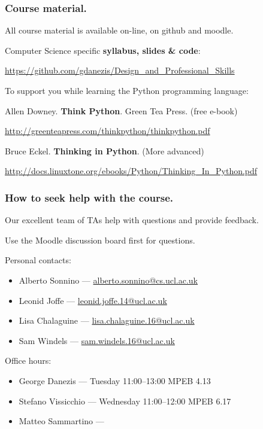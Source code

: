 \documentclass{beamer} %
\newcommand\emc[1]{\textcolor{brightblue}{\textbf{#1}}}
\begin{document}
\begin{frame}
\frametitle{Course material.} 

All course material is available on-line, on github and moodle.

\vspace{7mm}
Computer Science specific \emc{syllabus, slides \& code}: 

\url{https://github.com/gdanezis/Design_and_Professional_Skills}

\vspace{7mm}
To support you while learning the Python programming language:

\vspace{2mm}
Allen Downey. \emc{Think Python}. Green Tea Press. (free e-book)

{\small \url{http://greenteapress.com/thinkpython/thinkpython.pdf} }

\vspace{2mm}
Bruce Eckel. \emc{Thinking in Python}. (More advanced)

{\small \url{http://docs.linuxtone.org/ebooks/Python/Thinking_In_Python.pdf} }


\end{frame}

\begin{frame}
\frametitle{How to seek help with the course.} 

Our excellent team of TAs help with questions and provide feedback.

Use the Moodle discussion board first for questions.

\vspace{3mm}
Personal contacts:
\begin{itemize}
\item Alberto Sonnino --- \url{alberto.sonnino@cs.ucl.ac.uk}
\item Leonid Joffe --- \url{leonid.joffe.14@ucl.ac.uk}
\item Lisa Chalaguine --- \url{lisa.chalaguine.16@ucl.ac.uk}
\item Sam Windels --- \url{sam.windels.16@ucl.ac.uk}
\end{itemize}

\vspace{3mm}
Office hours:
\begin{itemize}
\item George Danezis --- Tuesday 11:00--13:00 MPEB 4.13
\item Stefano Vissicchio --- Wednesday 11:00--12:00 MPEB 6.17
\item Matteo Sammartino --- 
\end{itemize}


\end{frame}



\end{document}
